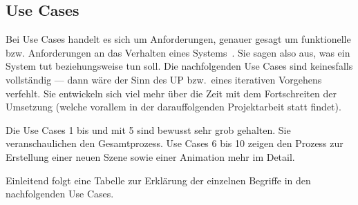 
\subsection{Use Cases}
\label{subsec:requirements:use-cases}

Bei Use Cases handelt es sich um Anforderungen, genauer gesagt um funktionelle
bzw. Anforderungen an das Verhalten eines Systems~\cite[S. 61 bis 63]{larman_applying_2004}.
Sie sagen also aus, was ein System tut beziehungsweise tun soll. Die nachfolgenden Use
Cases sind keinesfalls vollständig --- dann wäre der Sinn des UP bzw.\ eines
iterativen Vorgehens verfehlt. Sie entwickeln sich viel mehr über die Zeit mit
dem Fortschreiten der Umsetzung (welche vorallem in der darauffolgenden
Projektarbeit statt findet).

Die Use Cases 1 bis und mit 5 sind bewusst sehr grob gehalten. Sie
veranschaulichen den Gesamtprozess. Use Cases 6 bis 10 zeigen den Prozess zur
Erstellung einer neuen Szene sowie einer Animation mehr im Detail.

Einleitend folgt eine Tabelle zur Erklärung der einzelnen Begriffe in den
nachfolgenden Use Cases.












